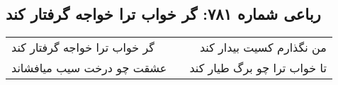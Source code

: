\begin{center}
\section*{رباعی شماره ۷۸۱: گر خواب ترا خواجه گرفتار کند}
\label{sec:0781}
\begin{longtable}{l p{0.5cm} r}
گر خواب ترا خواجه گرفتار کند
&&
من نگذارم کسیت بیدار کند
\\
عشقت چو درخت سیب میافشاند
&&
تا خواب ترا چو برگ طیار کند
\\
\end{longtable}
\end{center}
